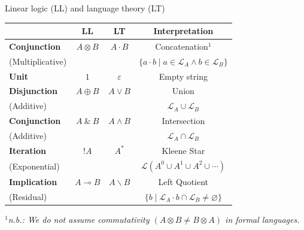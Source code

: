 \documentclass{beamer}
\begin{document}
\begin{frame}{Linear logic (LL) and language theory (LT)}
  \vspace{-0.3cm}
  \begin{center}
    \begin{tabular}{l c c c}
      \toprule
       & \textbf{LL} & \textbf{LT} & \textbf{Interpretation} \\
      \midrule

      \textbf{Conjunction} & $A \otimes B$ & $A\cdot B$ & Concatenation$^1$ \\
      \small{(Multiplicative)} &          & & $\{a\cdot b \mid a \in \mathcal{L}_A \land b \in \mathcal{L}_B\}$ \\
      \hline

      \textbf{Unit} & $1$ & $\varepsilon$ & Empty string \\
      \hline

      \textbf{Disjunction} & $A \oplus B$ & $A \vee B$ & Union \\
      \small{(Additive)} &        & & $\mathcal{L}_A \cup \mathcal{L}_B$ \\
      \hline

      \textbf{Conjunction} & $A \ \& \ B$ & $A \land B$ & Intersection \\
      \small{(Additive)} &        & & $\mathcal{L}_A \cap \mathcal{L}_B$ \\
      \hline

      \textbf{Iteration} & $!A$ & $A^*$ & Kleene Star \\
      \small{(Exponential)} &             & & $\mathcal{L}(A^0 \cup A^1 \cup A^2 \cup \cdots)$ \\
      \hline

      \textbf{Implication} & $A \multimap B$ & $A \backslash B$ & Left Quotient \\
      \small{(Residual)} &         & & $\{b \mid \mathcal{L}_A\cdot b \cap \mathcal{L}_B \neq \varnothing\}$ \\
      \bottomrule
    \end{tabular}
  \end{center}

  $^1$\footnotesize{\textit{n.b.: We do not assume commutativity $(A \otimes B \neq B \otimes A)$ in formal languages.}}
\end{frame}
\end{document}
